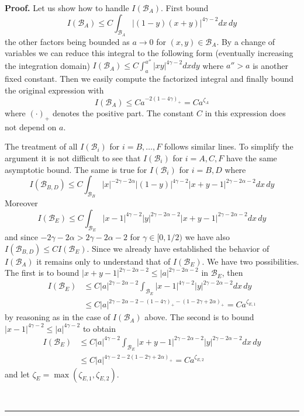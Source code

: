 \documentclass[a4paper,12pt,reqno]{article}
\newcommand{\cB}{\mathcal{B}}
\newenvironment{proof}[1][Proof]{\textbf{#1.} }{\ \rule{0.5em}{0.5em}}
\begin{document}
\begin{proof}
Let us show how to handle $I(\cB_A)$. First bound
$$
I(\cB_A) \le C \int_{\cB_A} 
|(1-y)(x+y)|^{4\gamma-2} d x\, d y
$$
the other factors being bounded as $a \to 0$ for $(x,y) \in \cB_A$. By a change of variables we can reduce this integral to the following  form (eventually increasing the integration domain)
$
I(\cB_A) \le C \int_{a}^{a''} |x y|^{4\gamma-2} dx dy
$
where $a''>a$ is another fixed constant. Then we easily compute the factorized integral and finally  bound the original expression with
$$
I(\cB_A) \le C a^{-2(1-4\gamma)_+} = C a^{\zeta_A}
$$
where $(\cdot)_+$ denotes the positive part. The constant $C$ in this expression does not depend on $a$. 

The treatment of all $I(\cB_i)$ for $i=B,\dots,F$ follows similar lines. To simplify the argument it is not difficult to see that $I(\cB_i)$ for $i=A,C,F$  have the same asymptotic bound. The same is true for $I(\cB_i)$ for $i=B,D$ where
$$
I(\cB_{B,D}) \le C \int_{\cB_B} 
|x|^{-2\gamma-2\alpha}|(1-y)|^{4\gamma-2} |x+y-1|^{2\gamma-2\alpha-2} d x\, d y
$$
Moreover
$$
I(\cB_{E}) \le C\int_{\cB_E} |x-1|^{4\gamma-2} |y|^{2\gamma-2\alpha-2} |x+y-1|^{2\gamma-2\alpha-2} dx\, dy
$$
and since $-2\gamma-2\alpha > 2\gamma-2\alpha-2$ for $\gamma \in [0,1/2)$ we have also
$
I(\cB_{B,D}) \le C I(\cB_E)
$.
Since we already have established the behavior of $I(\cB_A)$ it remains only to understand that of $I(\cB_E)$. We have two possibilities.
The first is to bound $|x+y-1|^{2\gamma-2\alpha-2} \le |a|^{2\gamma-2\alpha-2}$ in $\cB_E$, then
\begin{equation*}
  \begin{split}
I(\cB_{E}) & \le C |a|^{2\gamma-2\alpha-2} \int_{\cB_E} |x-1|^{4\gamma-2} |y|^{2\gamma-2\alpha-2}  dx\, dy
\\ & \le C |a|^{2\gamma-2\alpha-2 - (1-4\gamma)_+ - (1-2\gamma+2\alpha)_+}  = C a^{\zeta_{E,1}}  
  \end{split}
\end{equation*}
by reasoning as in the case of $I(\cB_A)$ above. The second is to bound $|x-1|^{4\gamma-2}\le |a|^{4\gamma-2}$ to obtain
\begin{equation*}
  \begin{split}
I(\cB_{E}) & \le C |a|^{4\gamma-2} \int_{\cB_E} |x+y-1|^{2\gamma-2\alpha-2} |y|^{2\gamma-2\alpha-2}  dx\, dy
\\ & \le C |a|^{4\gamma-2 - 2(1-2\gamma+2\alpha)_+}  = C a^{\zeta_{E,2}}  
  \end{split}
\end{equation*}
and let $\zeta_E = \max(\zeta_{E,1},\zeta_{E,2})$.


\end{proof}
\end{document}
